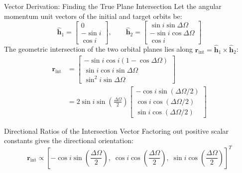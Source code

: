 \documentclass[aspectratio=169,10pt]{beamer}
\begin{document}
\begin{frame}{Vector Derivation: Finding the True Plane Intersection}
    \footnotesize
    Let the angular momentum unit vectors of the initial and target orbits be:
    $$\hat{\mathbf{h}}_1 = \begin{bmatrix} 0 \\ -\sin i \\ \cos i \end{bmatrix}, \qquad \hat{\mathbf{h}}_2 = \begin{bmatrix} \sin i \sin\Delta\Omega \\ -\sin i \cos\Delta\Omega \\ \cos i \end{bmatrix}$$
    The geometric intersection of the two orbital planes lies along $\mathbf{r}_{\text{int}} = \hat{\mathbf{h}}_1 \times \hat{\mathbf{h}}_2$:
    \vspace{-0.1cm}
    \begin{align*}
        \mathbf{r}_{\text{int}} &= \begin{bmatrix}
            -\sin i \cos i (1 - \cos\Delta\Omega) \\
            \sin i \cos i \sin\Delta\Omega \\
            \sin^2 i \sin\Delta\Omega
        \end{bmatrix} \\[4pt]
        &= 2 \sin i \sin\left(\frac{\Delta\Omega}{2}\right) \begin{bmatrix}
            -\cos i \sin(\Delta\Omega / 2) \\
            \cos i \cos(\Delta\Omega / 2) \\
            \sin i \cos(\Delta\Omega / 2)
        \end{bmatrix}
    \end{align*}
    
    \begin{exampleblock}{Directional Ratios of the Intersection Vector}
        \scriptsize
        Factoring out positive scalar constants gives the directional orientation:
        $$\mathbf{r}_{\text{int}} \propto \left[ -\cos i \sin\left(\frac{\Delta\Omega}{2}\right), \; \cos i \cos\left(\frac{\Delta\Omega}{2}\right), \; \sin i \cos\left(\frac{\Delta\Omega}{2}\right) \right]^T$$
    \end{exampleblock}
\end{frame}
\end{document}
